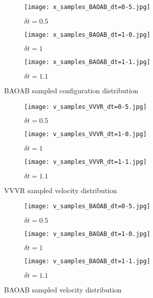 \documentclass[11pt]{article}
\begin{document}
\begin{figure}[H] %
    \centering
    \begin{subfigure}[b]{0.3\textwidth}
        \texttt{[image: x\_samples\_BAOAB\_dt=0-5.jpg]}
        \caption{$\delta t = 0.5$}
    \end{subfigure}
    \begin{subfigure}[b]{0.3\textwidth}
        \texttt{[image: x\_samples\_BAOAB\_dt=1-0.jpg]}
        \caption{$\delta t = 1$}
    \end{subfigure}
    \begin{subfigure}[b]{0.3\textwidth}
        \texttt{[image: x\_samples\_BAOAB\_dt=1-1.jpg]}
        \caption{$\delta t = 1.1$}
    \end{subfigure}
    \caption{BAOAB sampled configuration distribution}
\end{figure}

\begin{figure}[H] %
    \centering
    \begin{subfigure}[b]{0.3\textwidth}
        \texttt{[image: v\_samples\_VVVR\_dt=0-5.jpg]}
        \caption{$\delta t = 0.5$}
    \end{subfigure}
    \begin{subfigure}[b]{0.3\textwidth}
        \texttt{[image: v\_samples\_VVVR\_dt=1-0.jpg]}
        \caption{$\delta t = 1$}
    \end{subfigure}
    \begin{subfigure}[b]{0.3\textwidth}
        \texttt{[image: v\_samples\_VVVR\_dt=1-1.jpg]}
        \caption{$\delta t = 1.1$}
    \end{subfigure}
    \caption{VVVR sampled velocity distribution}
\end{figure}
\begin{figure}[H] %
    \centering
    \begin{subfigure}[b]{0.3\textwidth}
        \texttt{[image: v\_samples\_BAOAB\_dt=0-5.jpg]}
        \caption{$\delta t = 0.5$}
    \end{subfigure}
    \begin{subfigure}[b]{0.3\textwidth}
        \texttt{[image: v\_samples\_BAOAB\_dt=1-0.jpg]}
        \caption{$\delta t = 1$}
    \end{subfigure}
    \begin{subfigure}[b]{0.3\textwidth}
        \texttt{[image: v\_samples\_BAOAB\_dt=1-1.jpg]}
        \caption{$\delta t = 1.1$}
    \end{subfigure}
    \caption{BAOAB sampled velocity distribution}
\end{figure}
\end{document}
